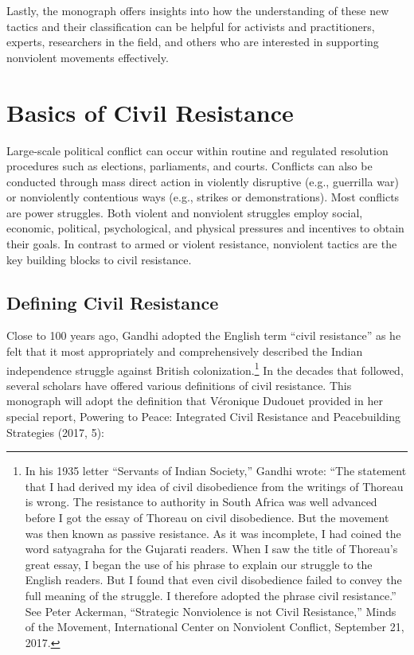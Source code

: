 \documentclass[twoside,a4paper,12pt,fleqn,openany]{extbook}
\begin{document}
Lastly, the monograph offers insights into how the understanding of these new tactics and their classification can be helpful for activists and practitioners, experts, researchers in the field, and others who are interested in supporting nonviolent movements effectively.

\chapter{Basics of Civil Resistance}

Large-scale political conflict can occur within routine and regulated resolution procedures such as elections, parliaments, and courts. Conflicts can also be conducted through mass direct action in violently disruptive (e.g., guerrilla war) or nonviolently contentious ways (e.g., strikes or demonstrations). Most conflicts are power struggles. Both violent and nonviolent struggles employ social, economic, political, psychological, and physical pressures and incentives to obtain their goals. In contrast to armed or violent resistance, nonviolent tactics are the key building blocks to civil resistance.

\section*{Defining Civil Resistance}

Close to 100 years ago, Gandhi adopted the English term “civil resistance” as he felt that it most appropriately and comprehensively described the Indian independence struggle against British colonization.\footnote{In his 1935 letter “Servants of Indian Society,” Gandhi wrote: “The statement that I had derived my idea of civil disobedience from the writings of Thoreau is wrong. The resistance to authority in South Africa was well advanced before I got the essay of Thoreau on civil disobedience. But the movement was then known as passive resistance. As it was incomplete, I had coined the word satyagraha for the Gujarati readers. When I saw the title of Thoreau’s great essay, I began the use of his phrase to explain our struggle to the English readers. But I found that even civil disobedience failed to convey the full meaning of the struggle. I therefore adopted the phrase civil resistance.” See Peter Ackerman, “Strategic Nonviolence is not Civil Resistance,” Minds of the Movement, International Center on Nonviolent Conflict, September 21, 2017.} In the decades that followed, several scholars have offered various definitions of civil resistance. This monograph will adopt the definition that Véronique Dudouet provided in her special report, Powering to Peace: Integrated Civil Resistance and Peacebuilding Strategies (2017, 5):
\end{document}
